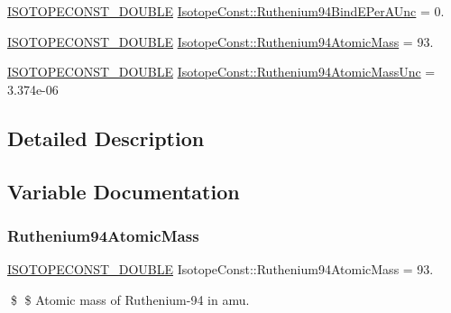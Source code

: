 \begin{DoxyCompactItemize}
\mbox{\hyperlink{group___isotope_const-_macros_ga8f45a7272ce02c0b4c65c44636ed719a}{I\+S\+O\+T\+O\+P\+E\+C\+O\+N\+S\+T\+\_\+\+D\+O\+U\+B\+LE}} \mbox{\hyperlink{group___isotope_const-_ruthenium-_ru94_ga01e2b2a6448dc52acd4b5a549b357566}{Isotope\+Const\+::\+Ruthenium94\+Bind\+E\+Per\+A\+Unc}} = 0.
\item 
\mbox{\hyperlink{group___isotope_const-_macros_ga8f45a7272ce02c0b4c65c44636ed719a}{I\+S\+O\+T\+O\+P\+E\+C\+O\+N\+S\+T\+\_\+\+D\+O\+U\+B\+LE}} \mbox{\hyperlink{group___isotope_const-_ruthenium-_ru94_gae5e043a43f7c340708f442e60309abd3}{Isotope\+Const\+::\+Ruthenium94\+Atomic\+Mass}} = 93.
\item 
\mbox{\hyperlink{group___isotope_const-_macros_ga8f45a7272ce02c0b4c65c44636ed719a}{I\+S\+O\+T\+O\+P\+E\+C\+O\+N\+S\+T\+\_\+\+D\+O\+U\+B\+LE}} \mbox{\hyperlink{group___isotope_const-_ruthenium-_ru94_ga9aa83093f845c99d305468339bb1c1ea}{Isotope\+Const\+::\+Ruthenium94\+Atomic\+Mass\+Unc}} = 3.\+374e-\/06
\end{DoxyCompactItemize}


\subsection{Detailed Description}


\subsection{Variable Documentation}
\mbox{\label{group___isotope_const-_ruthenium-_ru94_gae5e043a43f7c340708f442e60309abd3}} 
\subsubsection{\texorpdfstring{Ruthenium94\+Atomic\+Mass}{Ruthenium94AtomicMass}}
{\footnotesize\ttfamily \mbox{\hyperlink{group___isotope_const-_macros_ga8f45a7272ce02c0b4c65c44636ed719a}{I\+S\+O\+T\+O\+P\+E\+C\+O\+N\+S\+T\+\_\+\+D\+O\+U\+B\+LE}} Isotope\+Const\+::\+Ruthenium94\+Atomic\+Mass = 93.}

\$ \$ Atomic mass of Ruthenium-\/94 in amu. \mbox{\label{group___isotope_const-_ruthenium-_ru94_ga9aa83093f845c99d305468339bb1c1ea}} 
